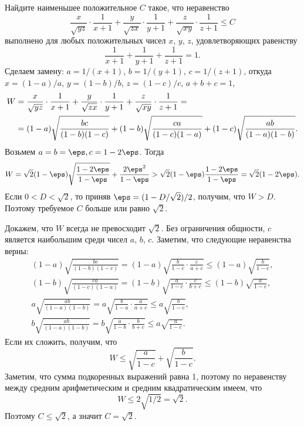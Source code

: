 \problem
Найдите наименьшее положительное $C$ такое, что неравенство
\[
    \frac{x}{\sqrt{yz}} \cdot \frac{1}{x+1}
    +
    \frac{y}{\sqrt{zx}} \cdot \frac{1}{y+1}
    +
    \frac{z}{\sqrt{xy}} \cdot \frac{1}{z+1}
\leq
    C
\]
выполнено для любых положительных чисел $x$, $y$, $z$, удовлетворяющих
равенству
\[
    \frac{1}{x+1} + \frac{1}{y+1} + \frac{1}{z+1}
=
    1
.\]
\solution
Сделаем замену:
$a = 1 / (x + 1)$, $b = 1 / (y + 1)$,  $c = 1 / (z + 1)$, откуда
$x = (1 - a) / a$, $y = (1 - b) / b$, $z = (1 - c) / c$,
$a + b + c = 1$,
\begin{align*}
    W
={}&
    \frac{x}{\sqrt{y z}} \cdot \frac{1}{x + 1}
    +
    \frac{y}{\sqrt{z x}} \cdot \frac{1}{y + 1}
    +
    \frac{z}{\sqrt{x y}} \cdot \frac{1}{z + 1}
=\\={}&
    (1 - a) \sqrt{\frac{b c \mathstrut}{(1 - b) (1 - c)}}
    +
    (1 - b) \sqrt{\frac{c a \mathstrut}{(1 - c) (1 - a)}}
    +
    (1 - c) \sqrt{\frac{a b \mathstrut}{(1 - a) (1 - b)}}
.\end{align*}
Возьмем $a = b = \eps, c = 1 - 2 \eps$.
Тогда 
\[
    W
=
    \sqrt{2} (1 - \eps) \sqrt{\frac{1 - 2 \eps}{1 - \eps}}
    +
    \frac{2{\eps}^2}{1 - \eps}
>
    \sqrt{2} (1 - \eps) \frac{1 - 2 \eps}{1 - \eps}
=
    \sqrt{2} (1 - 2 \eps).
\]
Если $0 < D < \sqrt{2}$, то приняв $\eps = (1 - D / \sqrt{2}) / 2$,
получим, что $W > D$.
Поэтому требуемое $C$ больше или равно $\sqrt{2}$.
\par
Докажем, что $W$ всегда не превосходит $\sqrt{2}$.
Без ограничения общности, $c$ является наибольшим среди чисел $a$, $b$, $c$.
Заметим, что следующие неравенства верны:
\begin{gather*}
    (1 - a) \sqrt{\frac{b c}{(1 - b) (1 - c)}}
=
    (1 - a) \sqrt{\frac{b}{1 - c} \cdot \frac{c}{a + c}}
\leq
    (1 - a) \sqrt{\frac{b}{1 - c}}
,\\
    (1 - b) \sqrt{\frac{c a}{(1 - c) (1 - a)}}
=
    (1 - b) \sqrt{\frac{a}{1 - c} \cdot \frac{c}{b + c}}
\leq
    (1 - b) \sqrt{\frac{a}{1 - c}}
,\\
    a \sqrt{\frac{a b}{(1 - a) (1 - b)}}
=
    a \sqrt{\frac{b}{1 - a} \cdot \frac{a}{a + c}}
\leq
    a \sqrt{\frac{b}{1 - c}}
,\\
    b \sqrt{\frac{a b}{(1 - a) (1 - b)}}
=
    b \sqrt{\frac{a}{1 - b} \cdot \frac{b}{b + c}}
\leq
    a \sqrt{\frac{a}{1 - c}}
.\end{gather*}
Если их сложить, получим, что 
\[
    W
\leq
    \sqrt{\frac{a}{1 - c}} + \sqrt{\frac{b}{1 - c}}
.\]
Заметим, что сумма подкоренных выражений равна 1, поэтому по неравенству
между средним арифметическим и средним квадратическим имеем, что
\[
    W
\leq
    2 \sqrt{1 / 2}
=
    \sqrt{2}
.\]
Поэтому $C \leq \sqrt{2}$, а значит $C = \sqrt{2}$.  
\endproblem
